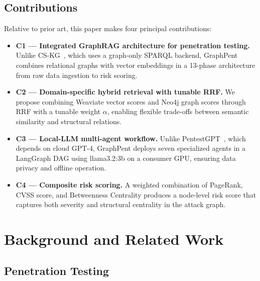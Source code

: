 \documentclass[conference]{IEEEtran}
\begin{document}
\subsection{Contributions}

Relative to prior art, this paper makes four principal contributions:

\begin{itemize}
  \item \textbf{C1 — Integrated GraphRAG architecture for penetration testing.}
        Unlike CS-KG~\cite{pan2025cskg}, which uses a graph-only SPARQL
        backend, GraphPent combines relational graphs with vector embeddings
        in a 13-phase architecture from raw data ingestion to risk scoring.

  \item \textbf{C2 — Domain-specific hybrid retrieval with tunable RRF.}
        We propose combining Weaviate vector scores and Neo4j graph scores
        through RRF with a tunable weight $\alpha$, enabling flexible
        trade-offs between semantic similarity and structural relations.

  \item \textbf{C3 — Local-LLM multi-agent workflow.}
        Unlike PentestGPT~\cite{deng2024pentestgpt}, which depends on cloud
        GPT-4, GraphPent deploys seven specialized agents in a LangGraph DAG
        using llama3.2:3b on a consumer GPU, ensuring data privacy and
        offline operation.

  \item \textbf{C4 — Composite risk scoring.}
        A weighted combination of PageRank, CVSS score, and Betweenness
        Centrality produces a node-level risk score that captures both
        severity and structural centrality in the attack graph.
\end{itemize}

\section{Background and Related Work}

\subsection{Penetration Testing}
\end{document}

